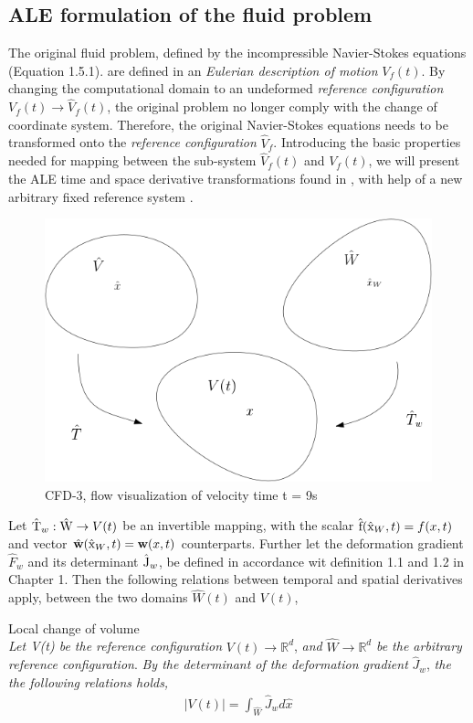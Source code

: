 \subsection{ALE formulation of the fluid problem}
The original fluid problem, defined by the incompressible Navier-Stokes equations (Equation 1.5.1). are defined in an \textit{Eulerian description of motion} $V_f (t)$. By changing the computational domain to an undeformed \textit{reference configuration} $V_f (t) \rightarrow \hat{V}_f (t)$, the original problem no longer comply with the change of coordinate system. Therefore, the original Navier-Stokes equations needs to be transformed onto the \textit{reference configuration} $\hat{V}_f $.
Introducing the basic properties needed for mapping between the sub-system $\hat{V}_f (t)$ and $V_f (t)$, we will present the ALE time and space derivative transformations found in \cite{Richter2016}, with help of a new arbitrary fixed reference system . 
\begin{figure}[h!]
  \centering
    \includegraphics[scale=0.5]{./Fig/wdom.png}
      \caption{CFD-3, flow visualization of velocity time t = 9s}
\end{figure}
Let $\text{\^{T}}_w : \text{\^{W}} \rightarrow V(t)$ be an invertible mapping, with the scalar $\text{\^{f}}(\text{\^{x}}_W, t) = f(x,t) $ and vector $\hat{\mathbf{w}}(\text{\^{x}}_W, t) = \mathbf{w}(x,t) $ counterparts. Further let the deformation gradient $\hat{F}_w$ and its determinant $\text{\^{J}}_w$, be defined in accordance wit definition 1.1 and 1.2 in Chapter 1. Then the following relations between temporal and spatial derivatives apply, between the two domains $\hat{W} (t)$ and $V (t)$,
\begin{lem}
Local change of volume \\
\textit{Let V(t) be the reference configuration} $V(t) \rightarrow \mathbb{R}^d$, \textit{and} $\hat{W} \rightarrow \mathbb{R}^d$ \textit{be the arbitrary reference configuration}. \textit{By the determinant of the deformation gradient} $\hat{J}_w$, \textit{the the following relations holds,}
\begin{align}
|V(t)| = \int_{\hat{W}} \hat{J}_w d \hat{x}
\end{align} 
\end{lem}
